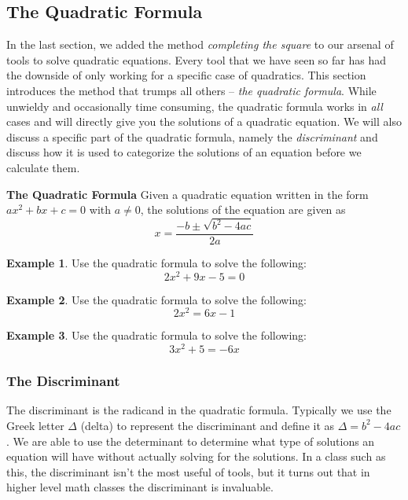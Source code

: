\documentclass[addpoints,12pt]{exam}
\theoremstyle{definition}
\theoremstyle{break}
\theoremstyle{break}
\newtheorem{example}{Example}[subsection]
\begin{document}
\setcounter{section}{11}
\setcounter{subsection}{1}

\subsection{The Quadratic Formula}
In the last section, we added the method \emph{completing the square} to our arsenal of tools to solve quadratic equations. Every tool that we have seen so far has had the downside of only working for a specific case of quadratics. This section introduces the method that trumps all others -- \emph{the quadratic formula}. While unwieldy and occasionally time consuming, the quadratic formula works in \emph{all} cases and will directly give you the solutions of a quadratic equation. We will also discuss a specific part of the quadratic formula, namely the \emph{discriminant} and discuss how it is used to categorize the solutions of an equation before we calculate them.
\vspace{.2in}
\begin{mdframed}
\textbf{The Quadratic Formula}
Given a quadratic equation written in the form $ax^2+bx+c=0$ with $a\neq 0$, the solutions of the equation are given as \[x = \dfrac{-b\pm\sqrt{b^2-4ac}}{2a}\]
\end{mdframed}

\vspace{.2in}

\begin{example}
Use the quadratic formula to solve the following:\[2x^2+9x-5=0\]

\end{example}

\newpage


\begin{example}
Use the quadratic formula to solve the following:\[2x^2=6x-1\]
\vspace{3.5in}
\end{example}
\begin{example}
Use the quadratic formula to solve the following:\[3x^2+5=-6x\]
\vspace{3.5in}
\end{example}

\newpage

\subsubsection*{The Discriminant}

The discriminant is the radicand in the quadratic formula. Typically we use the Greek letter $\Delta$ (delta) to represent the discriminant and define it as $\Delta = b^2-4ac$. We are able to use the determinant to determine what type of solutions an equation will have without actually solving for the solutions. In a class such as this, the discriminant isn't the most useful of tools, but it turns out that in higher level math classes the discriminant is invaluable.
\end{document}
